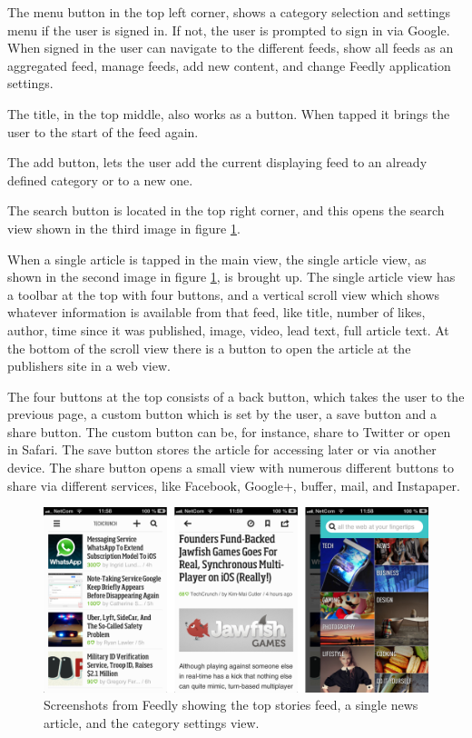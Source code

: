 The menu button in the top left corner, shows a category selection and settings menu if the user is signed in. If not, the user is prompted to sign in via Google. When signed in the user can navigate to the different feeds, show all feeds as an aggregated feed, manage feeds, add new content, and change Feedly application settings.

The title, in the top middle, also works as a button. When tapped it brings the user to the start of the feed again.

The add button, lets the user add the current displaying feed to an already defined category or to a new one.

The search button is located in the top right corner, and this opens the search view shown in the third image in figure \ref{screenshots_feedly}.

When a single article is tapped in the main view, the single article view, as shown in the second image in figure \ref{screenshots_feedly}, is brought up. The single article view has a toolbar at the top with four buttons, and a vertical scroll view which shows whatever information is available from that feed, like title, number of likes, author, time since it was published, image, video, lead text, full article text. At the bottom of the scroll view there is a button to open the article at the publishers site in a web view.

The four buttons at the top consists of a back button, which takes the user to the previous page, a custom button which is set by the user, a save button and a share button.
The custom button can be, for instance, share to Twitter or open in Safari. The save button stores the article for accessing later or via another device. The share button opens a small view with numerous different buttons to share via different services, like Facebook, Google+, buffer, mail, and Instapaper.

\begin{figure}[!htbp]
\centering
\includegraphics[width=130mm]{GFX/screenshots/feedly.png}
\caption{Screenshots from Feedly showing the top stories feed, a single news article, and the category settings view.}
\label{screenshots_feedly}
\end{figure}

